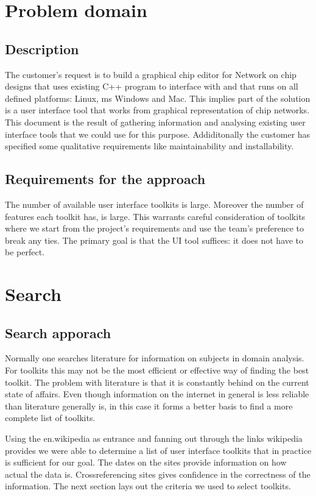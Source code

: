 \section{Problem domain}
\subsection{Description}

The customer's request is to build a graphical chip editor for Network on chip
designs that uses existing C++ program to interface with and that runs on all
defined platforms: Linux, ms Windows and Mac. This implies part of the solution
is a user interface tool that works from graphical representation of chip
networks. This document is the result of gathering information and analysing
existing user interface tools that we could use for this purpose. Addiditonally
the customer has specified some qualitative requirements like maintainability
and installability.

\subsection{Requirements for the approach}

The number of available user interface toolkits is large.  Moreover the number
of features each toolkit has, is large. This warrants careful consideration of
toolkits where we start from the project's requirements and use the team's
preference to break any ties.  The primary goal is that the UI tool suffices:
it does not have to be perfect.

\section{Search}

\subsection{Search apporach}

Normally one searches literature for information on subjects in domain
analysis.  For toolkits this may not be the most efficient or effective way of
finding the best toolkit. The problem with literature is that it is constantly
behind on the current state of affairs. Even though information on the internet
in general is less reliable than literature generally is, in this case it forms
a better basis to find a more complete list of toolkits. 

Using the en.wikipedia as entrance and fanning out through the links wikipedia
provides we were able to determine a list of user interface toolkits that in
practice is sufficient for our goal. The dates on the sites provide information
on how actual the data is. Crossreferencing sites gives confidence in the
correctness of the information. The next section lays out the criteria we used
to select toolkits.

